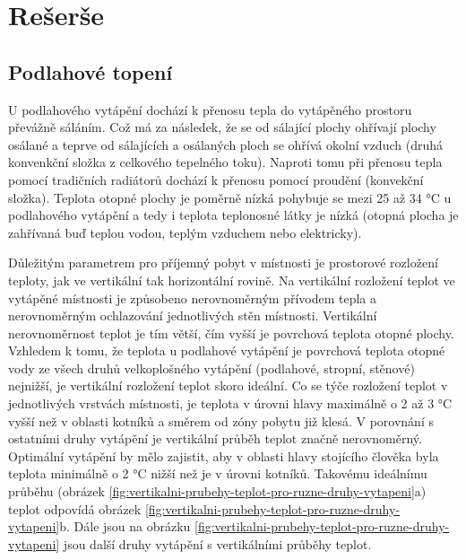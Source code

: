 

\chapter{Rešerše}


\section{Podlahové topení}

U podlahového vytápění dochází k přenosu tepla do vytápěného prostoru převážně sáláním. Což má za následek, že se od sálající plochy ohřívají plochy osálané a teprve od sálajících a osálaných ploch se ohřívá okolní vzduch (druhá konvenkční složka z celkového tepelného toku). Naproti tomu při přenosu tepla pomocí tradičních radiátorů dochází k přenosu pomocí proudění (konvekční složka). 
Teplota otopné plochy je poměrně nízká pohybuje se mezi 25 až 34 °C u podlahového vytápění a tedy i teplota teplonosné látky je nízká (otopná plocha je zahřívaná buď teplou vodou, teplým vzduchem nebo elektricky). 

Důležitým parametrem pro příjemný pobyt v místnosti je prostorové rozložení teploty, jak ve vertikální tak horizontální rovině. Na vertikální rozložení teplot ve vytápěné místnosti je způsobeno nerovnoměrným přívodem tepla a nerovnoměrným ochlazování jednotlivých stěn místnosti. Vertikální nerovnoměrnost teplot je tím větší, čím vyšší je povrchová teplota otopné plochy. Vzhledem k tomu, že teplota u podlahové vytápění je povrchová teplota otopné vody ze všech druhů velkoplošného vytápění (podlahové, stropní, stěnové) nejnižší, je vertikální rozložení teplot skoro ideální. Co se týče rozložení teplot v jednotlivých vrstvách místnosti, je teplota v úrovni hlavy maximálně o 2 až 3 °C vyšší než v oblasti kotníků a směrem od zóny pobytu již klesá. V porovnání s ostatními druhy vytápění je vertikální průběh teplot značně nerovnoměrný. Optimální vytápění by mělo zajistit, aby v oblasti hlavy stojícího člověka byla teplota minimálně o 2 °C nižší než je v úrovni kotníků. Takovému ideálnímu průběhu (obrázek  \ref{fig:vertikalni-prubehy-teplot-pro-ruzne-druhy-vytapeni}a) teplot odpovídá obrázek \ref{fig:vertikalni-prubehy-teplot-pro-ruzne-druhy-vytapeni}b. Dále jsou na obrázku  \ref{fig:vertikalni-prubehy-teplot-pro-ruzne-druhy-vytapeni} jsou další druhy vytápění s vertikálními průběhy teplot.

